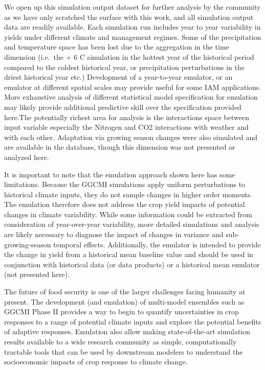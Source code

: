 \documentclass[preprint, 5p, times, twocolumn]{elsarticle}
\begin{document}
We open up this simulation output dataset for further analysis by the community as we have only scratched the surface with this work, and all simulation output data are readily available. Each simulation run includes year to year variability in yields under different climate and management regimes. Some of the precipitation and temperature space has been lost due to the aggregation in the time dimension (i.e.\ the + 6 C simulation in the hottest year of the historical period compared to the coldest historical year, or precipitation perturbations in the driest historical year etc.) Development of a year-to-year emulator, or an emulator at different spatial scales may provide useful for some IAM applications. More exhaustive analysis of different statistical model specification for emulation may likely provide additional predictive skill over the specification provided here.The potentially richest area for analysis is the interactions space between input variable especially the Nitrogen and CO2 interactions with weather and with each other. Adaptation via growing season changes were also simulated and are available in the database, though this dimension was not presented or analyzed here.

It is important to note that the emulation approach shown here has some limitations. Because the GGCMI simulations apply uniform perturbations to historical climate inputs, they do not sample changes in higher order moments. The emulation therefore does not address the crop yield impacts of potential changes in climate variability. While some information could be extracted from consideration of year-over-year variability, more detailed simulations and analysis are likely necessary to diagnose the impact of changes in variance and sub-growing-season temporal effects. Additionally, the emulator is intended to provide the change in yield from a historical mean baseline value and should be used in conjunction with historical data (or data products) or a historical mean emulator (not presented here).

The future of food security is one of the larger challenges facing humanity at present. The development (and emulation) of multi-model ensembles such as GGCMI Phase II provides a way to begin to quantify uncertainties in crop responses to a range of potential climate inputs and explore the potential benefits of adaptive responses. Emulation also allow making state-of-the-art simulation results available to a wide research community as simple, computationally tractable tools that can be used by downstream modelers to understand the socioeconomic impacts of crop response to climate change. 
\end{document}
